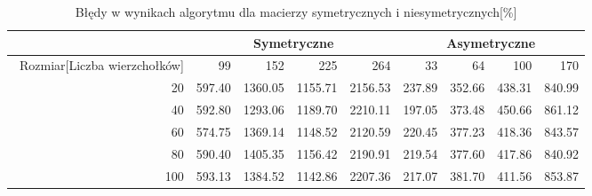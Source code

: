 \begin{table}
\begin{tabular}{|r|r|r|r|r|r|r|r|r|}
\hline
 & \multicolumn{4}{|c|}{Symetryczne} & \multicolumn{4}{|c|}{Asymetryczne} \\ \hline\
Rozmiar[Liczba wierzchołków] & 99 & 152 & 225 & 264 & 33 & 64 & 100 & 170 \\ \hline
20 & 597.40 & 1360.05 & 1155.71 & 2156.53 & 237.89 & 352.66 & 438.31 & 840.99 \\
40 & 592.80 & 1293.06 & 1189.70 & 2210.11 & 197.05 & 373.48 & 450.66 & 861.12 \\
60 & 574.75 & 1369.14 & 1148.52 & 2120.59 & 220.45 & 377.23 & 418.36 & 843.57 \\
80 & 590.40 & 1405.35 & 1156.42 & 2190.91 & 219.54 & 377.60 & 417.86 & 840.92 \\
100 & 593.13 & 1384.52 & 1142.86 & 2207.36 & 217.07 & 381.70 & 411.56 & 853.87 \\ \hline
\end{tabular}
\caption{Błędy w wynikach algorytmu dla macierzy symetrycznych i niesymetrycznych[\%]}
\label{tab:error_AnEpoch}
\end{table}

